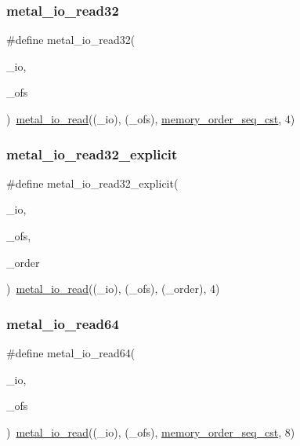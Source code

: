 \subsubsection{\texorpdfstring{metal\+\_\+io\+\_\+read32}{metal\_io\_read32}}
{\footnotesize\ttfamily \#define metal\+\_\+io\+\_\+read32(\begin{DoxyParamCaption}\item[{}]{\+\_\+io,  }\item[{}]{\+\_\+ofs }\end{DoxyParamCaption})~\hyperlink{group__io_ga0cd8707fcac0d892726f1e946186c531}{metal\+\_\+io\+\_\+read}((\+\_\+io), (\+\_\+ofs), \hyperlink{compiler_2gcc_2atomic_8h_a17c2de5ae768960284c047a320f17d1ba2d21914d1edd227a890107e7878a3752}{memory\+\_\+order\+\_\+seq\+\_\+cst}, 4)}

\mbox{\label{group__io_ga66042ac971a891260b34a06dde2bfa58}} 
\subsubsection{\texorpdfstring{metal\+\_\+io\+\_\+read32\+\_\+explicit}{metal\_io\_read32\_explicit}}
{\footnotesize\ttfamily \#define metal\+\_\+io\+\_\+read32\+\_\+explicit(\begin{DoxyParamCaption}\item[{}]{\+\_\+io,  }\item[{}]{\+\_\+ofs,  }\item[{}]{\+\_\+order }\end{DoxyParamCaption})~\hyperlink{group__io_ga0cd8707fcac0d892726f1e946186c531}{metal\+\_\+io\+\_\+read}((\+\_\+io), (\+\_\+ofs), (\+\_\+order), 4)}

\mbox{\label{group__io_gace90c4af8066a7a31111bbaaefbc631e}} 
\subsubsection{\texorpdfstring{metal\+\_\+io\+\_\+read64}{metal\_io\_read64}}
{\footnotesize\ttfamily \#define metal\+\_\+io\+\_\+read64(\begin{DoxyParamCaption}\item[{}]{\+\_\+io,  }\item[{}]{\+\_\+ofs }\end{DoxyParamCaption})~\hyperlink{group__io_ga0cd8707fcac0d892726f1e946186c531}{metal\+\_\+io\+\_\+read}((\+\_\+io), (\+\_\+ofs), \hyperlink{compiler_2gcc_2atomic_8h_a17c2de5ae768960284c047a320f17d1ba2d21914d1edd227a890107e7878a3752}{memory\+\_\+order\+\_\+seq\+\_\+cst}, 8)}

